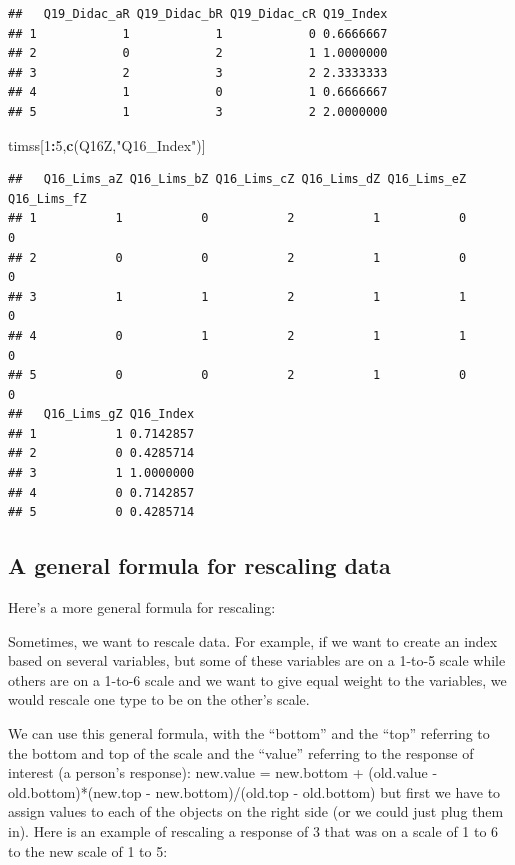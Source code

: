 \documentclass[
]{article}
\newenvironment{Shaded}{\begin{snugshade}}{\end{snugshade}}
\newcommand{\DecValTok}[1]{\textcolor[rgb]{0.00,0.00,0.81}{#1}}
\newcommand{\KeywordTok}[1]{\textcolor[rgb]{0.13,0.29,0.53}{\textbf{#1}}}
\newcommand{\NormalTok}[1]{#1}
\newcommand{\OperatorTok}[1]{\textcolor[rgb]{0.81,0.36,0.00}{\textbf{#1}}}
\newcommand{\StringTok}[1]{\textcolor[rgb]{0.31,0.60,0.02}{#1}}
\begin{document}
\begin{verbatim}
##   Q19_Didac_aR Q19_Didac_bR Q19_Didac_cR Q19_Index
## 1            1            1            0 0.6666667
## 2            0            2            1 1.0000000
## 3            2            3            2 2.3333333
## 4            1            0            1 0.6666667
## 5            1            3            2 2.0000000
\end{verbatim}

\begin{Shaded}
\begin{Highlighting}[]
\NormalTok{timss[}\DecValTok{1}\OperatorTok{:}\DecValTok{5}\NormalTok{,}\KeywordTok{c}\NormalTok{(Q16Z,}\StringTok{"Q16_Index"}\NormalTok{)]  }
\end{Highlighting}
\end{Shaded}

\begin{verbatim}
##   Q16_Lims_aZ Q16_Lims_bZ Q16_Lims_cZ Q16_Lims_dZ Q16_Lims_eZ Q16_Lims_fZ
## 1           1           0           2           1           0           0
## 2           0           0           2           1           0           0
## 3           1           1           2           1           1           0
## 4           0           1           2           1           1           0
## 5           0           0           2           1           0           0
##   Q16_Lims_gZ Q16_Index
## 1           1 0.7142857
## 2           0 0.4285714
## 3           1 1.0000000
## 4           0 0.7142857
## 5           0 0.4285714
\end{verbatim}

\hypertarget{a-general-formula-for-rescaling-data}{%
\subsection{A general formula for rescaling data}\label{a-general-formula-for-rescaling-data}}

Here's a more general formula for rescaling:

Sometimes, we want to rescale data. For example, if we want to create an index based on several variables, but some of these variables are on a 1-to-5 scale while others are on a 1-to-6 scale and we want to give equal weight to the variables, we would rescale one type to be on the other's scale.

We can use this general formula, with the ``bottom'' and the ``top'' referring to the bottom and top of the scale and the ``value'' referring to the response of interest (a person's response): new.value = new.bottom + (old.value - old.bottom)*(new.top - new.bottom)/(old.top - old.bottom) but first we have to assign values to each of the objects on the right side (or we could just plug them in). Here is an example of rescaling a response of 3 that was on a scale of 1 to 6 to the new scale of 1 to 5:
\end{document}
